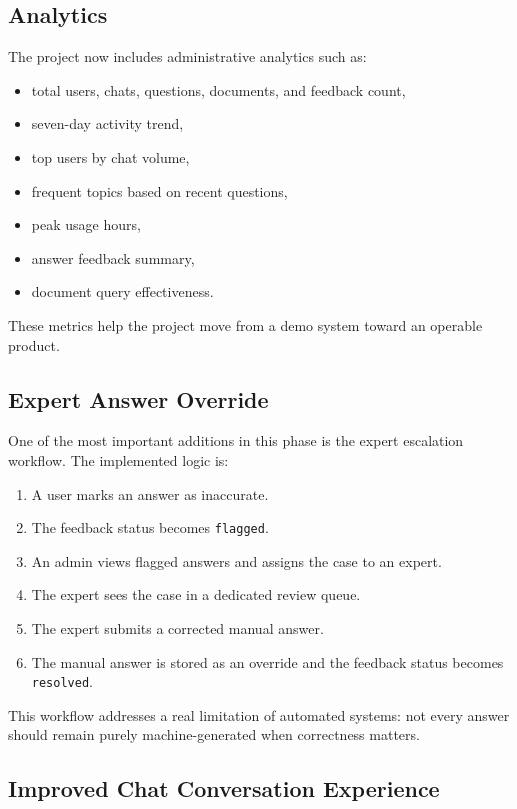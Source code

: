 \documentclass[12pt,a4paper]{report}
\begin{document}
\subsection{Analytics}

The project now includes administrative analytics such as:
\begin{itemize}[leftmargin=1.5em]
\item total users, chats, questions, documents, and feedback count,
\item seven-day activity trend,
\item top users by chat volume,
\item frequent topics based on recent questions,
\item peak usage hours,
\item answer feedback summary,
\item document query effectiveness.
\end{itemize}

These metrics help the project move from a demo system toward an operable product.

\subsection{Expert Answer Override}

One of the most important additions in this phase is the expert escalation workflow. The implemented logic is:
\begin{enumerate}[leftmargin=1.5em]
\item A user marks an answer as inaccurate.
\item The feedback status becomes \texttt{flagged}.
\item An admin views flagged answers and assigns the case to an expert.
\item The expert sees the case in a dedicated review queue.
\item The expert submits a corrected manual answer.
\item The manual answer is stored as an override and the feedback status becomes \texttt{resolved}.
\end{enumerate}

This workflow addresses a real limitation of automated systems: not every answer should remain purely machine-generated when correctness matters.

\subsection{Improved Chat Conversation Experience}
\end{document}
